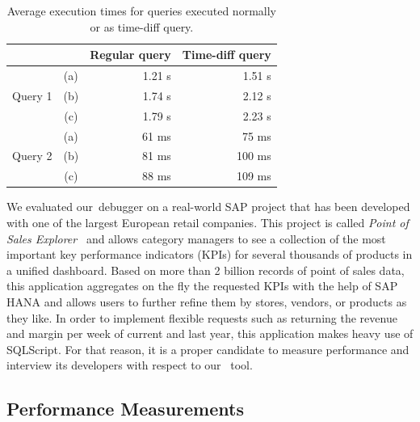 \begin{table}
	\centering
	\begin{tabulary}{\textwidth}{lcRR}
	\toprule
				&		& Regular query& Time-diff query \\ \midrule
	
			 &	(a) &	1.21 s		& 1.51 s	\\
Query 1& (b)	&	1.74 s		& 2.12 s	\\
			 &	(c) &	1.79 s		& 2.23 s	\\ \midrule

			 &	(a) &	61 ms		&  75 ms	\\
Query 2& (b)	&	81 ms		& 100 ms	\\ 
			 &	(c) &	88 ms		& 109 ms	\\ \bottomrule
	\end{tabulary}
	\caption{Average execution times for queries executed normally or as time-diff query.}
	\label{tab:measure2}
\end{table}

%

We evaluated our \tool\,debugger on a real-world SAP project that has been developed with one of the largest European retail companies. 
This project is called \emph{Point of Sales Explorer}~\cite{plattner15:the_in-memory_revolution_how} and allows category managers to see a collection of the most important key performance indicators (KPIs) for several thousands of products in a unified dashboard.
Based on more than 2 billion records of point of sales data, this application aggregates on the fly the requested KPIs with the help of SAP HANA and allows users to further refine them by stores, vendors, or products as they like. 
In order to implement flexible requests such as returning the revenue and margin per week of current and last year, this application makes heavy use of SQLScript. 
For that reason, it is a proper candidate to measure performance and interview its developers with respect to our \tool\ tool. 

\subsection{Performance Measurements}

